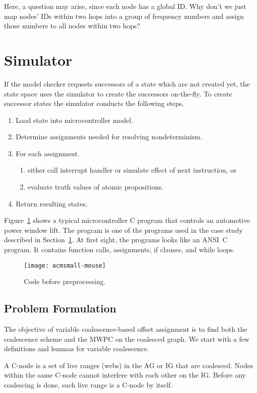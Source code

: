 Here, a question may arise, since each node has a global ID. Why
don't we just map nodes' IDs within two hops into a group of
frequency numbers and assign those numbers to all nodes within two
hops?

\section{Simulator}
\label{sec:sim}

If the model checker requests successors of a state which are not
created yet, the state space uses the simulator to create the
successors on-the-fly. To create successor states the simulator
conducts the following steps.
\begin{enumerate}
\item Load state into microcontroller model.
\item Determine assignments needed for resolving nondeterminism.
\item For each assignment.
      \begin{enumerate}
      \item either call interrupt handler or simulate effect of next instruction, or
      \item evaluate truth values of atomic propositions.
      \end{enumerate}
\item Return resulting states.
\end{enumerate}
Figure~\ref{fig:one} shows a typical microcontroller C program that
controls an automotive power window lift. The program is one of the
programs used in the case study described in Section~\ref{sec:sim}.
At first sight, the programs looks like an ANSI~C program. It
contains function calls, assignments, if clauses, and while loops.
\begin{figure}
\centerline{\texttt{[image: acmsmall-mouse]}}
\caption{Code before preprocessing.}
\label{fig:one}
\end{figure}

\subsection{Problem Formulation}

The objective of variable coalescence-based offset assignment is to find
both the coalescence scheme and the MWPC on the coalesced graph. We start
with a few definitions and lemmas for variable coalescence.

\begin{definition}A C-node is a set of
live ranges (webs) in the AG or IG that are coalesced. Nodes within the same
C-node cannot interfere with each other on the IG. Before any coalescing is
done, each live range is a C-node by itself.
\end{definition}

